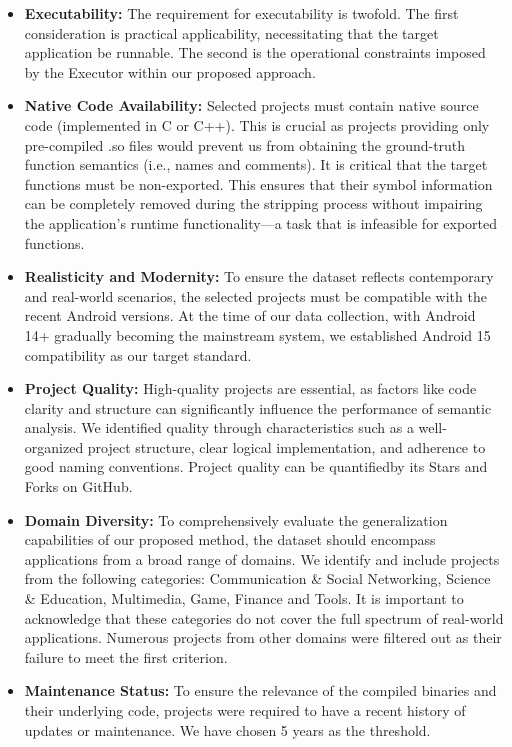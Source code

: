 \documentclass[acmsmall,screen,review,anonymous]{acmart} %
\begin{document}
\begin{itemize}
    \item \textbf{Executability:} The requirement for executability is twofold. The first consideration is practical applicability, necessitating that the target application be runnable. The second is the operational constraints imposed by the Executor within our proposed approach.

    \item \textbf{Native Code  Availability:} Selected projects must contain native source code (implemented in C or C++). This is crucial as projects providing only pre-compiled .so files would prevent us from obtaining the ground-truth function semantics (i.e., names and comments). It is critical that the target functions must be non-exported. This ensures that their symbol information can be completely removed during the stripping process without impairing the application's runtime functionality—a task that is infeasible for exported functions.

    \item \textbf{Realisticity and Modernity:} To ensure the dataset reflects contemporary and real-world scenarios, the selected projects must be compatible with the recent Android versions. At the time of our data collection, with Android 14+ gradually becoming the mainstream system, we established Android 15 compatibility as our target standard.

    \item \textbf{Project Quality:} High-quality projects are essential, as factors like code clarity and structure can significantly influence the performance of semantic analysis. We identified quality through characteristics such as a well-organized project structure, clear logical implementation, and adherence to good naming conventions. Project quality can be quantifiedby its Stars and Forks on GitHub.

    \item \textbf{Domain Diversity:} To comprehensively evaluate the generalization capabilities of our proposed method, the dataset should encompass applications from a broad range of domains. We identify and include projects from the following categories: Communication \& Social Networking,  Science \& Education, Multimedia, Game, Finance and Tools. It is important to acknowledge that these categories do not cover the full spectrum of real-world applications. Numerous projects from other domains were filtered out as their failure to meet the first criterion.

    \item \textbf{Maintenance Status:} To ensure the relevance of the compiled binaries and their underlying code, projects were required to have a recent history of updates or maintenance. We have chosen 5 years as the threshold.
\end{itemize}
\end{document}
